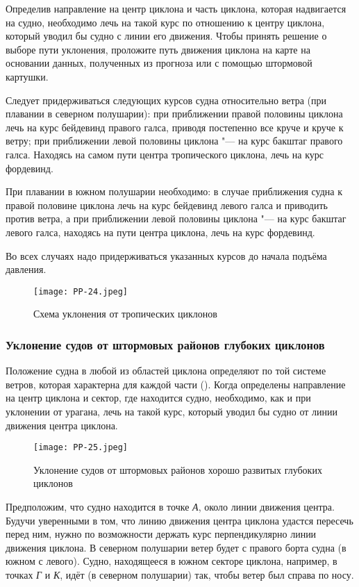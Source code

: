 Определив направление на центр циклона и часть циклона, которая
надвигается на судно, необходимо лечь на такой курс по отношению к
центру циклона, который уводил бы судно с линии его движения. Чтобы
принять решение о выборе пути уклонения, проложите путь движения
циклона на карте на основании данных, полученных из прогноза или с
помощью штормовой картушки.

Следует придерживаться следующих курсов судна относительно ветра (при
плавании в северном полушарии): при приближении правой половины
циклона лечь на курс бейдевинд правого галса, приводя постепенно все
круче и круче к ветру; при приближении левой половины циклона "--- на курс
бакштаг правого галса. Находясь на самом пути центра тропического
циклона, лечь на курс фордевинд.

При плавании в южном полушарии необходимо: в случае приближения судна
к правой половине циклона лечь на курс бейдевинд левого галса и
приводить против ветра, а при приближении левой половины циклона "---
на курс бакштаг левого галса, находясь на пути центра циклона, лечь на
курс фордевинд.

Во всех случаях надо придерживаться указанных курсов до начала подъёма
давления.

\begin{figure}[htb]
  \centering{}
  \texttt{[image: PP-24.jpeg]}
  \caption{Схема уклонения от тропических циклонов}
  \label{fig:pp24}
  \small
  \centering{}
\end{figure}

\subsubsection{Уклонение судов от штормовых районов глубоких циклонов}

Положение судна в любой из областей циклона определяют по той системе
ветров, которая характерна для каждой части (). Когда
определены направление на центр циклона и сектор, где находится судно,
необходимо, как и при уклонении от урагана, лечь на такой курс,
который уводил бы судно от линии движения центра циклона.

\begin{figure}[htb]
  \centering{}
  \texttt{[image: PP-25.jpeg]}
  \caption{Уклонение судов от штормовых районов хорошо развитых глубоких циклонов}
  \label{fig:pp25}
  \small
  \centering{}
\end{figure}

Предположим, что судно находится в точке \textit{А}, около линии
движения центра. Будучи уверенными в том, что линию движения центра
циклона удастся пересечь перед ним, нужно по возможности держать курс
перпендикулярно линии движения циклона. В северном полушарии ветер
будет с правого борта судна (в южном с левого). Судно, находящееся в
южном секторе циклона, например, в точках \textit{Г} и \textit{К},
идёт (в северном полушарии) так, чтобы ветер был справа по носу.

